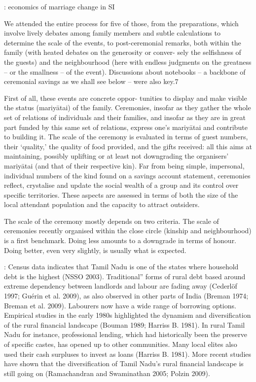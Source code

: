 \documentclass[a4paper, 11pt, onecolumn]{article}
\begin{document}
\cite{Dharmalingam1994} : economics of marriage change in SI




\cite{Guerin2020c}
We attended the entire process for five of those, from the preparations, which involve
lively debates among family members and subtle calculations to determine the scale of the events, to
post-ceremonial remarks, both within the family (with heated debates on the generosity or conver-
sely the selfishness of the guests) and the neighbourhood (here with endless judgments on the greatness – or the smallness – of the event). Discussions about notebooks – a backbone of ceremonial
savings as we shall see below – were also key.7

First of all, these events are concrete oppor-
tunities to display and make visible the status (mariyātai) of the family. Ceremonies, insofar as they
gather the whole set of relations of individuals and their families, and insofar as they are in great part
funded by this same set of relations, express one’s mariyātai and contribute to building it. The scale of
the ceremony is evaluated in terms of guest numbers, their ‘quality,’ the quality of food provided, and
the gifts received: all this aims at maintaining, possibly uplifting or at least not downgrading the
organisers’ mariyātai (and that of their respective kin). Far from being simple, impersonal, individual
numbers of the kind found on a savings account statement, ceremonies reflect, crystalise and update
the social wealth of a group and its control over specific territories. These aspects are assessed in
terms of both the size of the local attendant population and the capacity to attract outsiders.

The scale of the ceremony mostly depends on two criteria. The scale of ceremonies recently
organised within the close circle (kinship and neighbourhood) is a first benchmark. Doing less
amounts to a downgrade in terms of honour. Doing better, even very slightly, is usually what is
expected.









\cite{Guerin2014a} : Census data indicates that Tamil Nadu is one of the states where household debt is the highest (NSSO
2003). 
Traditional” forms of rural debt based around extreme dependency between
landlords and labour are fading away (Cederlöf 1997; Guérin et al. 2009), as also observed in
other parts of India (Breman 1974; Breman et al. 2009). Labourers now have a wide range of
borrowing options. Empirical studies in the early 1980s highlighted the dynamism and
diversification of the rural financial landscape (Bouman 1989; Harriss B. 1981). In rural
Tamil Nadu for instance, professional lending, which had historically been the preserve of
specific castes, has opened up to other communities. Many local elites also used their cash
surpluses to invest as loans (Harriss B. 1981). More recent studies have shown that the
diversification of Tamil Nadu’s rural financial landscape is still going on (Ramachandran and
Swaminathan 2005; Polzin 2009).
\end{document}
